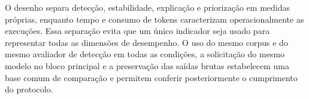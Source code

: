 O desenho separa detecção, estabilidade, explicação e priorização em medidas próprias, enquanto tempo e consumo de tokens caracterizam operacionalmente as execuções. Essa separação evita que um único indicador seja usado para representar todas as dimensões de desempenho. O uso do mesmo corpus e do mesmo avaliador de detecção em todas as condições, a solicitação do mesmo modelo no bloco principal e a preservação das saídas brutas estabelecem uma base comum de comparação e permitem conferir posteriormente o cumprimento do protocolo.
